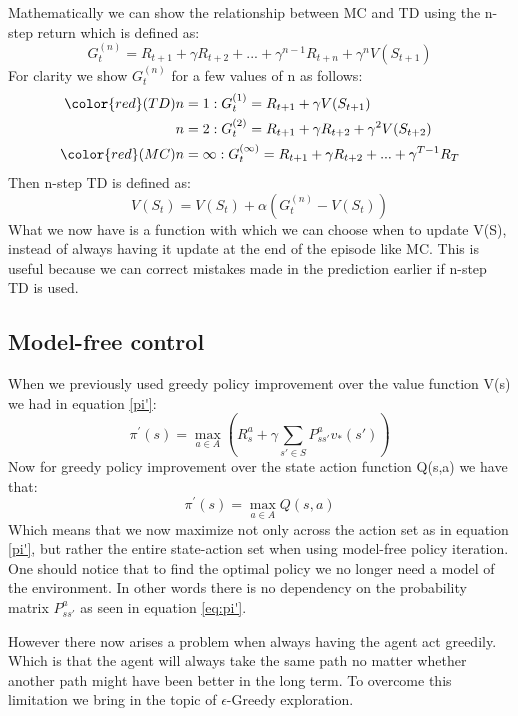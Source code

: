 Mathematically we can show the relationship between MC and TD using the n-step return which is defined as:
\begin{equation}
	G_{t}^{(n)} = R_{t+1} + \gamma R_{t+2} + ... + \gamma^{n-1}R_{t+n} + \gamma^{n}V(S_{t+1})
\end{equation}
For clarity we show 
$G_{t}^{(n)}$ for a few values of n as follows:\\
\begin{align}
	 {\color{red}(TD)} n &= 1: G_{t}^{(1)} = R_{t+1}+\gamma V(S_{t+1}) \label{eq:td} \\
	n &= 2 : G_{t}^{(2)} = R_{t+1}+ \gamma R_{t+2}+\gamma^2 V(S_{t+2}) \\
	{\color{red}(MC)} n &= \infty : G_{t}^{(\infty)} = R_{t+1}+ \gamma R_{t+2}+...+\gamma^{T-1} R_T \label{eq:mc_td}
\end{align}
Then n-step TD is defined as:
\begin{equation}
	V(S_t) = V(S_t) + \alpha(G_t^{(n)} - V(S_t))
	\label{eq:n_step_TD}
\end{equation} 
What we now have is a function with which we can choose when to update V(S), instead of always having it update at the end of the episode like MC. This is useful because we can correct mistakes made in the prediction earlier if n-step TD is used.
\subsection{Model-free control}

When we previously used greedy policy improvement over the value function V(s) we had in equation \ref{pi'}:
\[\pi^{'}(s) = \max\limits_{a \in A}(R^{a}_s+\gamma\sum_{s'\in S}P^{a}_{ss'}v_*(s'))\]
Now for greedy policy improvement over the state action function Q(s,a) we have that:
\begin{equation}
	\pi^{'}(s) = \max\limits_{a \in A}Q(s,a)
	\label{eq:pi'}
\end{equation}
Which means that we now maximize not only across the action set as in equation \ref{pi'}, but rather the entire state-action set when using model-free policy iteration. One should notice that to find the optimal policy we no longer need a model of the environment. In other words there is no dependency on the probability matrix $P^{a}_{ss'}$ as seen in equation \ref{eq:pi'}.

However there now arises a problem when always having the agent act greedily. Which is that the agent will always take the same path no matter whether another path might have been better in the long term. To overcome this limitation we bring in the topic of $\epsilon$-Greedy exploration.

